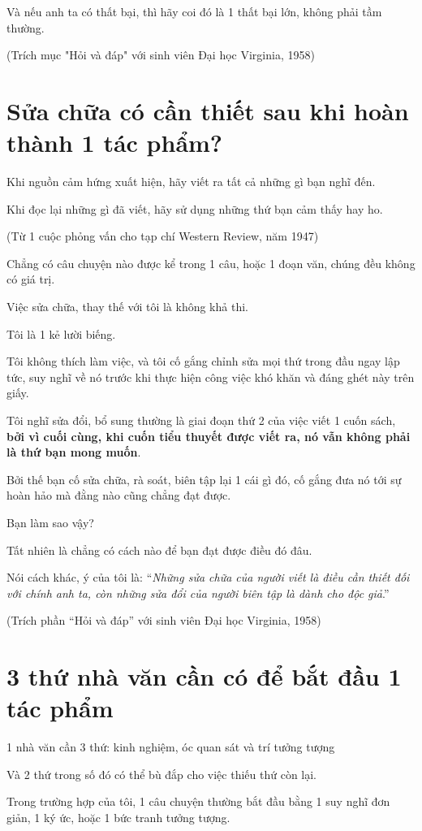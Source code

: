 \documentclass{book}
\numberwithin{equation}{section}
\begin{document}
Và nếu anh ta có thất bại, thì hãy coi đó là 1 thất bại lớn, không phải tầm thường.

(Trích mục "Hỏi và đáp" với sinh viên Đại học Virginia, 1958)

\section{Sửa chữa có cần thiết sau khi hoàn thành 1 tác phẩm?}
Khi nguồn cảm hứng xuất hiện, hãy viết ra tất cả những gì bạn nghĩ đến.

Khi đọc lại những gì đã viết, hãy sử dụng những thứ bạn cảm thấy hay ho.

(Từ 1 cuộc phỏng vấn cho tạp chí Western Review, năm 1947)

%
Chẳng có câu chuyện nào được kể trong 1 câu, hoặc 1 đoạn văn, chúng đều không có giá trị.

Việc sửa chữa, thay thế với tôi là không khả thi.

Tôi là 1 kẻ lười biếng.

Tôi không thích làm việc, và tôi cố gắng chỉnh sửa mọi thứ trong đầu ngay lập tức, suy nghĩ về nó trước khi thực hiện công việc khó khăn và đáng ghét này trên giấy.

Tôi nghĩ sửa đổi, bổ sung thường là giai đoạn thứ 2 của việc viết 1 cuốn sách,\textbf{ bởi vì cuối cùng, khi cuốn tiểu thuyết được viết ra, nó vẫn không phải là thứ bạn mong muốn}.

Bởi thế bạn cố sửa chữa, rà soát, biên tập lại 1 cái gì đó, cố gắng đưa nó tới sự hoàn hảo mà đằng nào cũng chẳng đạt được.

Bạn làm sao vậy?

Tất nhiên là chẳng có cách nào để bạn đạt được điều đó đâu.

Nói cách khác, ý của tôi là: ``\textit{Những sửa chữa của người viết là điều cần thiết đối với chính anh ta, còn những sửa đổi của người biên tập là dành cho độc giả}.''

(Trích phần ``Hỏi và đáp'' với sinh viên Đại học Virginia, 1958)

\section{3 thứ nhà văn cần có để bắt đầu 1 tác phẩm}
1 nhà văn cần 3 thứ: kinh nghiệm, óc quan sát và trí tưởng tượng

Và 2 thứ trong số đó có thể bù đắp cho việc thiếu thứ còn lại.

Trong trường hợp của tôi, 1 câu chuyện thường bắt đầu bằng 1 suy nghĩ đơn giản, 1 ký ức, hoặc 1 bức tranh tưởng tượng.
\end{document}
